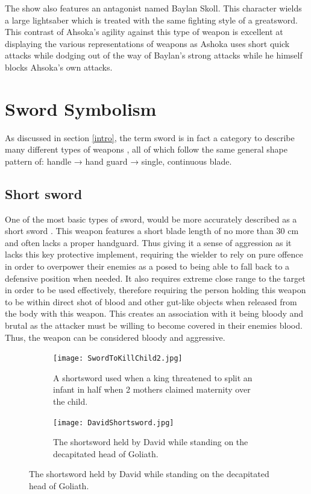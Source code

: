 \documentclass{article}
\begin{document}
The show also features an antagonist named Baylan Skoll. This character wields a large lightsaber which is treated with the same fighting style of a greatsword. This contrast of Ahsoka's agility against this type of weapon is excellent at displaying the various representations of weapons as Ashoka uses short quick attacks while dodging out of the way of Baylan's strong attacks while he himself blocks Ahsoka's own attacks.

\pagebreak

\section{Sword Symbolism} \label{swordSymbol}
As discussed in section \ref{intro}, the term sword is in fact a category to describe many different types of weapons \parencite{furat1998brief}, all of which follow the same general shape pattern of: handle → hand guard → single, continuous blade.

\subsection{Short sword} \label{shortSwordSymbol}
One of the most basic types of sword, would be more accurately described as a short sword \parencite{mcnab2010swords}. This weapon features a short blade length of no more than 30 cm and often lacks a proper handguard. Thus giving it a sense of aggression as it lacks this key protective implement, requiring the wielder to rely on pure offence in order to overpower their enemies as a posed to being able to fall back to a defensive position when needed. It also requires extreme close range to the target in order to be used effectively, therefore requiring the person holding this weapon to be within direct shot of blood and other gut-like objects when released from the body with this weapon. This creates an association with it being bloody and brutal as the attacker must be willing to become covered in their enemies blood. Thus, the weapon can be considered bloody and aggressive.

\begin{figure}[h]
    \centering
    \caption{A collection of shortswords being used in brutish circumstances}
    \begin{subfigure}{0.3\textwidth}
        \texttt{[image: SwordToKillChild2.jpg]}
        \caption{A shortsword used when a king threatened to split an infant in half when 2 mothers claimed maternity over the child.}
        \label{fig:killChild}
    \end{subfigure}
    \begin{subfigure}{0.3\textwidth}
        \texttt{[image: DavidShortsword.jpg]}
        \caption{The shortsword held by David while standing on the decapitated head of Goliath.}
        \label{fig:goliathDead}
    \end{subfigure}
    \label{fig:shortswords}
\end{figure}
\end{document}
